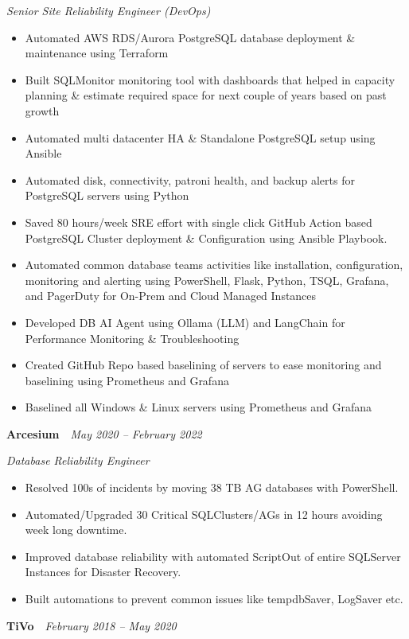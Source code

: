 \documentclass[10pt,a4paper]{article}
\begin{document}
\textit{Senior Site Reliability Engineer (DevOps)}
\begin{itemize}
  \item Automated AWS RDS/Aurora PostgreSQL database deployment \& maintenance using Terraform
  \item Built SQLMonitor monitoring tool with dashboards that helped in capacity planning \& estimate required space for next couple of years based on past growth
  \item Automated multi datacenter HA \& Standalone PostgreSQL setup using Ansible
  \item Automated disk, connectivity, patroni health, and backup alerts for PostgreSQL servers using Python
  \item Saved 80 hours/week SRE effort with single click GitHub Action based PostgreSQL Cluster deployment \& Configuration using Ansible Playbook.
  \item Automated common database teams activities like installation, configuration, monitoring and alerting using PowerShell, Flask, Python, TSQL, Grafana, and PagerDuty for On-Prem and Cloud Managed Instances
  \item Developed DB AI Agent using Ollama (LLM) and LangChain for Performance Monitoring \& Troubleshooting
  \item Created GitHub Repo based baselining of servers to ease monitoring and baselining using Prometheus and Grafana
  \item Baselined all Windows \& Linux servers using Prometheus and Grafana
\end{itemize}

\noindent\textbf{Arcesium}~\hfill~\textit{May 2020 -- February 2022}

\textit{Database Reliability Engineer}
\begin{itemize}
  \item Resolved 100s of incidents by moving 38 TB AG databases with PowerShell.
  \item Automated/Upgraded 30 Critical SQLClusters/AGs in 12 hours avoiding week long downtime.
  \item Improved database reliability with automated ScriptOut of entire SQLServer Instances for Disaster Recovery.
  \item Built automations to prevent common issues like tempdbSaver, LogSaver etc.
\end{itemize}

\noindent\textbf{TiVo}~\hfill~\textit{February 2018 -- May 2020}
\end{document}
